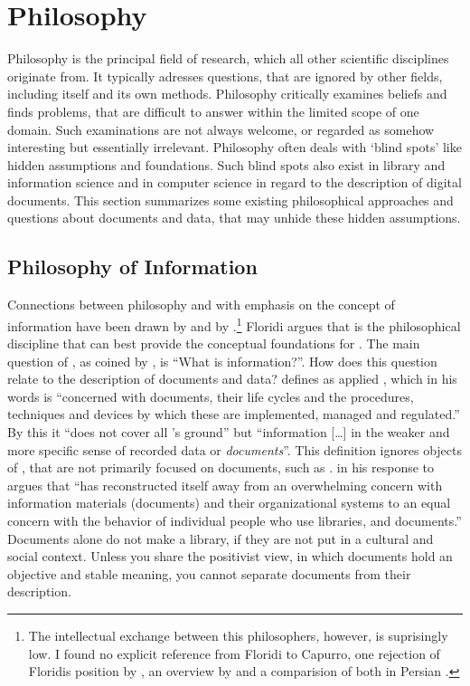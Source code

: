 \section{Philosophy}
\label{sec:philosophy}

Philosophy is the principal field of research, which all other scientific
disciplines originate from. It typically adresses questions, that are ignored 
by other fields, including itself and its own methods. Philosophy 
critically examines beliefs and finds problems, that are difficult to answer
within the limited scope of one domain. Such examinations are not always
welcome, or regarded as somehow interesting but essentially irrelevant. 
Philosophy often deals with `blind spots' like hidden assumptions and
foundations. Such blind spots also exist in library and information science 
and in computer science in regard to the description of digital documents.
This section summarizes some existing philosophical approaches and questions
about documents and data, that may unhide these hidden assumptions.

\subsection{Philosophy of Information} 

Connections between philosophy and 
with emphasis on the concept of information have been drawn by
\textcite{Floridi2002} and by \textcite{Capurro2003}.\footnote{The intellectual
exchange between this philosophers, however, is suprisingly low. I found no
explicit reference from Floridi to Capurro, one rejection of Floridis position
by \textcite{Capurro2008}, an overview by \textcite{Compton2006} and a
comparision of both in Persian \cite{Khandan2009}.} Floridi argues that
 is the philosophical discipline that can
best provide the conceptual foundations for . The main question of
, as coined by \textcite{Floridi2002w}, is ``What is information?''.
How does this question relate to the description of documents and data?
\textcite{Floridi2002} defines  as applied , which in his
words is ``concerned with documents, their life cycles and the procedures,
techniques and devices by which these are implemented, managed and regulated.''
By this it ``does not cover all ’s ground'' but ``information [\ldots]
in the weaker and more specific sense of recorded data or \emph{documents}''.
This definition ignores objects of , that are not primarily focused
on documents, such as . \textcite{Cornelius2004} in
his response to \textcite{Floridi2002} argues that  ``has
reconstructed itself away from an overwhelming concern with information
materials (documents) and their organizational systems to an equal concern with
the behavior of individual people who use libraries, and documents.'' Documents
alone do not make a library, if they are not put in a cultural and social
context.  Unless you share the positivist view, in which documents hold an
objective and stable meaning, you cannot separate documents from their
description.

